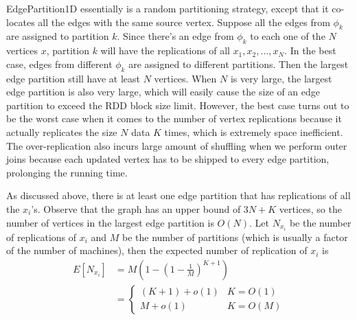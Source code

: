

EdgePartition1D essentially is a random partitioning strategy, except that it
co-locates all the edges with the same source vertex. Suppose all the edges from
$\phi_k$ are assigned to partition $k$. Since there's an edge from $\phi_k$ to
each one of the $N$ vertices $x$, partition $k$ will have the replications
of all $x_1, x_2, \ldots, x_N$. In the best case,
edges from different $\phi_k$ are assigned to different
partitions. Then the largest edge partition still have at least $N$ vertices.
When $N$ is very large, the largest edge partition is also very large, which
will easily cause the size of an edge partition to exceed the RDD block size limit. However,
the best case turns out to be the worst case
when it comes to the number of vertex replications
because it actually replicates the size $N$ data $K$ times, which is
extremely space inefficient. The over-replication also incurs large amount of
shuffling when we perform outer joins because each updated vertex has to
be shipped to every edge partition, prolonging the running time.

As discussed above, there is at least one edge partition that
has replications of all the $x_i$'s.
Observe that the graph has an upper bound of
$3N + K$ vertices, so the number of vertices in the largest edge partition is
$O(N)$. Let $N_{x_i}$ be the number of replications of $x_i$
and $M$ be the number of partitions (which is usually a factor of the number of machines),
then the expected
number of replication of $x_i$ is
\begin{align*}
	E[N_{x_i}] &= M(1 - (1 - \frac{1}{M})^{K+1}) \\
		&= \left\{
			\begin{array}{ll}
				(K + 1) + o(1) & K = O(1) \\
				M + o(1) & K = O(M)
			\end{array}
		\right.%
\end{align*}


